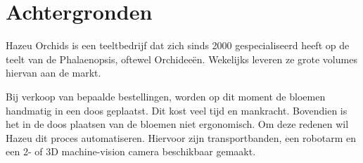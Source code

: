 
\section{Achtergronden}

Hazeu Orchids is een teeltbedrijf dat zich sinds 2000 gespecialiseerd heeft op de teelt van de Phalaenopsis, oftewel Orchideeën.
Wekelijks leveren ze grote volumes hiervan aan de markt.

\bigskip

Bij verkoop van bepaalde bestellingen, worden op dit moment de bloemen handmatig in een doos geplaatst.
Dit kost veel tijd en mankracht.
Bovendien is het in de doos plaatsen van de bloemen niet ergonomisch.
Om deze redenen wil Hazeu dit proces automatiseren.
Hiervoor zijn transportbanden, een robotarm en een 2- of 3D machine-vision camera beschikbaar gemaakt.

\newpage
